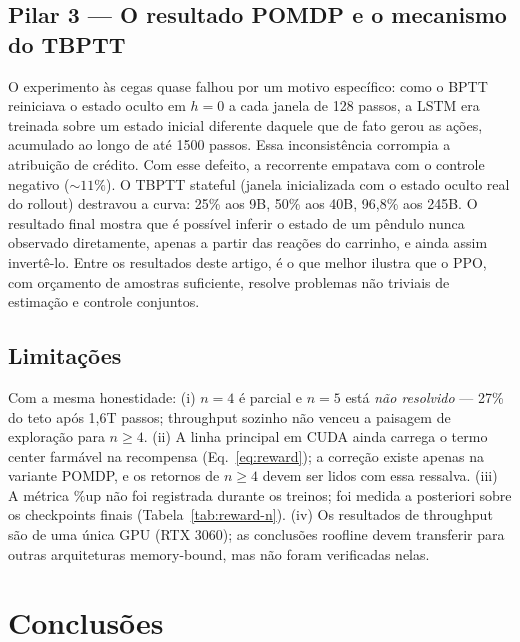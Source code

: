 \documentclass[12pt]{article}
\begin{document}
\subsection{Pilar 3 --- O resultado POMDP e o mecanismo do TBPTT}
\label{sec:analise-pomdp}

O experimento às cegas quase falhou por um motivo específico: como o BPTT
reiniciava o estado oculto em $h{=}0$ a cada janela de 128 passos, a LSTM era
treinada sobre um estado inicial diferente daquele que de fato gerou as ações,
acumulado ao longo de até 1500 passos. Essa inconsistência corrompia a
atribuição de crédito. Com esse defeito, a recorrente empatava com o controle
negativo
(${\sim}11\%$). O TBPTT stateful (janela inicializada com o estado oculto real
do rollout) destravou a curva: 25\% aos 9B, 50\% aos 40B, 96,8\% aos 245B. O
resultado final mostra que é possível inferir o estado de um pêndulo nunca
observado diretamente, apenas a partir das reações do carrinho, e ainda assim
invertê-lo. Entre os resultados deste artigo, é o que melhor ilustra que o PPO,
com orçamento de amostras suficiente, resolve problemas não triviais de
estimação e controle conjuntos.

\subsection{Limitações}\label{sec:limitacoes}

Com a mesma honestidade: (i) $n{=}4$ é parcial e $n{=}5$ está \emph{não
resolvido} --- 27\% do teto após 1,6T passos; throughput sozinho não venceu a
paisagem de exploração para $n \geq 4$. (ii) A linha principal em CUDA ainda
carrega o termo $\mathrm{center}$ farmável na recompensa
(Eq.~\ref{eq:reward}); a correção existe apenas na variante POMDP, e os
retornos de $n \geq 4$ devem ser lidos com essa ressalva. (iii) A métrica
\%up não foi registrada durante os treinos; foi medida a posteriori sobre os
checkpoints finais (Tabela~\ref{tab:reward-n}).
(iv) Os resultados de throughput são
de uma única GPU (RTX 3060); as conclusões roofline devem transferir para
outras arquiteturas memory-bound, mas não foram verificadas nelas.

\section{Conclusões}\label{sec:conclusao}
\end{document}
